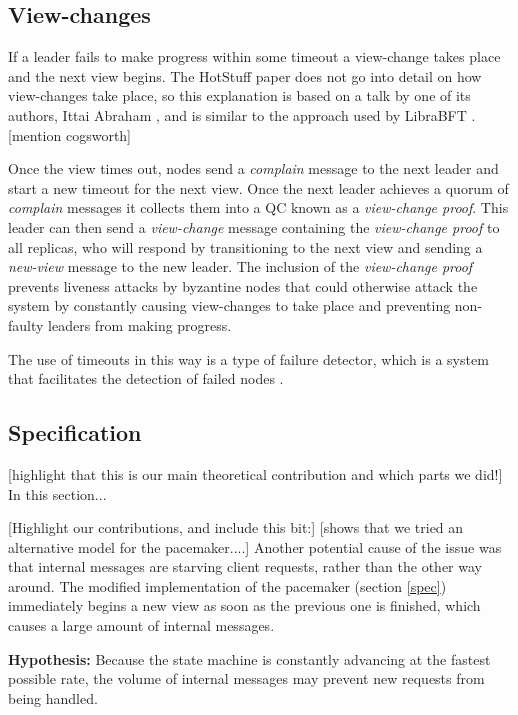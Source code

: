 \subsection{View-changes} \label{viewchange}
If a leader fails to make progress within some timeout a view-change takes place and the next view begins. The HotStuff paper does not go into detail on how view-changes take place, so this explanation is based on a talk by one of its authors, Ittai Abraham \cite{ittai}, and is similar to the approach used by LibraBFT \cite{baudet_state_nodate}. [mention cogsworth]

Once the view times out, nodes send a \textit{complain} message to the next leader and start a new timeout for the next view. Once the next leader achieves a quorum of \textit{complain} messages it collects them into a QC known as a \textit{view-change proof}. This leader can then send a \textit{view-change} message containing the \textit{view-change proof} to all replicas, who will respond by transitioning to the next view and sending a \textit{new-view} message to the new leader. The inclusion of the \textit{view-change proof} prevents liveness attacks by byzantine nodes that could otherwise attack the system by constantly causing view-changes to take place and preventing non-faulty leaders from making progress.

The use of timeouts in this way is a type of failure detector, which is a system that facilitates the detection of failed nodes \cite{chandra_weakest_1996}\cite{chandra_unreliable_1996}.

\subsection{Specification}
[highlight that this is our main theoretical contribution and which parts we did!]
In this section...


[Highlight our contributions, and include this bit:]
[shows that we tried an alternative model for the pacemaker....]
Another potential cause of the issue was that internal messages are starving client requests, rather than the other way around. The modified implementation of the pacemaker (section \ref{spec}) immediately begins a new view as soon as the previous one is finished, which causes a large amount of internal messages.

\textbf{Hypothesis: } Because the state machine is constantly advancing at the fastest possible rate, the volume of internal messages may prevent new requests from being handled.

